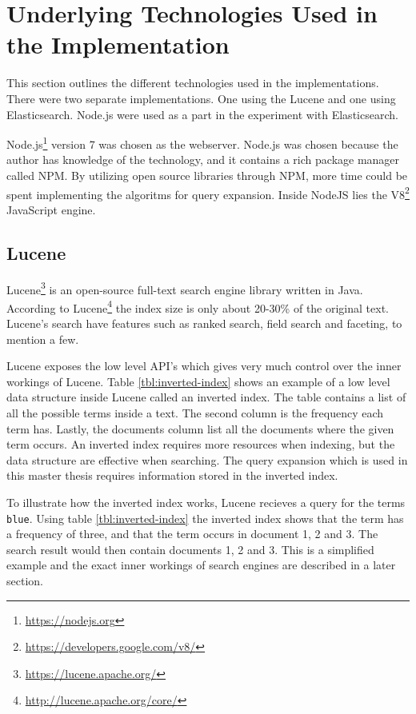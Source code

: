 \section{Underlying Technologies Used in the Implementation}
This section outlines the different technologies used in the implementations.
There were two separate implementations.
One using the Lucene and one using Elasticsearch.
Node.js were used as a part in the experiment with Elasticsearch.

Node.js\footnote{\url{https://nodejs.org}} version 7 was chosen as the webserver.
Node.js was chosen because the author has knowledge of the technology,
and it contains a rich package manager called NPM.
By utilizing open source libraries through NPM, more time could be spent implementing the algoritms for query expansion.
Inside NodeJS lies the V8\footnote{\url{https://developers.google.com/v8/}} JavaScript engine.

\subsection{Lucene}
Lucene\footnote{\url{https://lucene.apache.org/}} is an open-source full-text search engine library written in Java.
According to Lucene\footnote{\url{http://lucene.apache.org/core/}} the index size is only about 20-30\% of the original text.
Lucene's search have features such as ranked search, field search and faceting, to mention a few.

Lucene exposes the low level API's which gives very much control over the inner workings of Lucene.
Table \ref{tbl:inverted-index} shows an example of a low level data structure inside Lucene called an inverted index.
The table contains a list of all the possible terms inside a text.
The second column is the frequency each term has.
Lastly, the documents column list all the documents where the given term occurs.
An inverted index requires more resources when indexing,
but the data structure are effective when searching.
The query expansion which is used in this master thesis requires information stored in the inverted index.

To illustrate how the inverted index works, Lucene recieves a query for the terms \texttt{blue}.
Using table \ref{tbl:inverted-index} the inverted index shows that the term has a frequency of three,
and that the term occurs in document 1, 2 and 3.
The search result would then contain documents 1, 2 and 3.
This is a simplified example and the exact inner workings of search engines are described in a later section.

